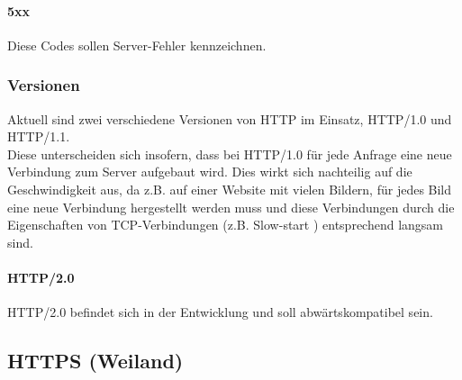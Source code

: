 \paragraph{5xx}
Diese Codes sollen Server-Fehler kennzeichnen.

\subsubsection{Versionen}
Aktuell sind zwei verschiedene Versionen von HTTP im Einsatz, HTTP/1.0 und HTTP/1.1.
\\
Diese unterscheiden sich insofern, dass bei HTTP/1.0 für jede Anfrage eine neue Verbindung zum Server aufgebaut wird. Dies wirkt sich nachteilig auf die Geschwindigkeit aus, da z.B. auf einer Website mit vielen Bildern, für jedes Bild eine neue Verbindung hergestellt werden muss und diese Verbindungen durch die Eigenschaften von TCP-Verbindungen (z.B. Slow-start ) entsprechend langsam sind.

\paragraph{HTTP/2.0}  HTTP/2.0 befindet sich in der Entwicklung und soll abwärtskompatibel sein.

\subsection{HTTPS (Weiland)}
